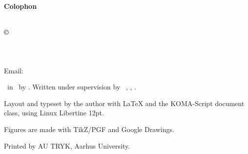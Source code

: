\documentclass[../main.tex]{subfiles} %
\begin{document}
\clearpage %

\thispagestyle{empty} %

\vspace*{\fill} %

\begin{center} %
    \textbf{\textsf{Colophon}} %
\end{center}
\vspace{1em} %

\noindent %
\textsl{\Title}\\

\noindent
$\copyright$ \Year\ \Author\\
\Department\\
\University\\
\DepartmentAddress\\
Email: \AuthorEmail \vspace{1.5em} %



\noindent %
\Doctype\ in \MakeLowercase{\SubjectOfStudy}\ by \Author. Written under supervision by \SupervisorTitle\ \Supervisor, \Department, \University.
\vspace{.5em} %

\noindent %
Layout and typeset by the author with LaTeX and the KOMA-Script document class, using Linux Libertine 12pt.
\vspace{.5em} %

\noindent %
Figures are made with TikZ/PGF and Google Drawings.
\vspace{.5em} %

\noindent %
Printed by AU TRYK, Aarhus University.

\end{document}
